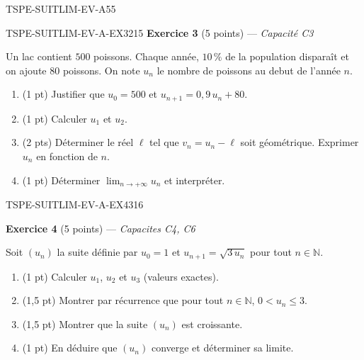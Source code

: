 \begin{evaluation}{TSPE-SUITLIM-EV-A}{55}
\begin{exercice}{TSPE-SUITLIM-EV-A-EX3}{2}{15}
\textbf{Exercice 3} (5 points) — \textit{Capacité C3}

\medskip

Un lac contient $500$ poissons. Chaque année, $10\,\%$ de la population disparaît et on ajoute $80$ poissons. On note $u_n$ le nombre de poissons au debut de l'année $n$.

\begin{enumerate}
  \item (1 pt) Justifier que $u_0 = 500$ et $u_{n+1} = 0{,}9\,u_n + 80$.
  \item (1 pt) Calculer $u_1$ et $u_2$.
  \item (2 pts) Déterminer le réel $\ell$ tel que $v_n = u_n - \ell$ soit géométrique. Exprimer $u_n$ en fonction de $n$.
  \item (1 pt) Déterminer $\lim_{n \to +\infty} u_n$ et interpréter.
\end{enumerate}

\end{exercice}


\begin{exercice}{TSPE-SUITLIM-EV-A-EX4}{3}{16}

\textbf{Exercice 4} (5 points) — \textit{Capacites C4, C6}

\medskip

Soit $(u_n)$ la suite définie par $u_0 = 1$ et $u_{n+1} = \sqrt{3\,u_n}$ pour tout $n \in \mathbb{N}$.

\begin{enumerate}
  \item (1 pt) Calculer $u_1$, $u_2$ et $u_3$ (valeurs exactes).
  \item (1,5 pt) Montrer par récurrence que pour tout $n \in \mathbb{N}$, $0 < u_n \leq 3$.
  \item (1,5 pt) Montrer que la suite $(u_n)$ est croissante.
  \item (1 pt) En déduire que $(u_n)$ converge et déterminer sa limite.
\end{enumerate}

\end{exercice}

\end{evaluation}
